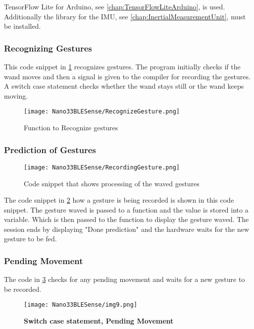 TensorFlow Lite for Arduino, see \ref{chap:TensorFlowLiteArduino}, is used. Additionally the library for the IMU, see \ref{chap:InertialMeasurementUnit}, must be installed.







\subsubsection{Recognizing Gestures}

This code snippet in \ref{fig:img13} recognizes gestures. The program initially checks if the wand moves and then a signal is given to the compiler for recording the gestures. A switch case statement checks whether the wand stays still or the wand keeps moving.

\begin{figure}[h!]
    \texttt{[image: Nano33BLESense/RecognizeGesture.png]}
    \caption{Function to Recognize gestures}
    \label{fig:img13}
\end{figure}

\subsubsection{Prediction of Gestures}

\begin{figure}[h!]
    \texttt{[image: Nano33BLESense/RecordingGesture.png]}
    \caption{Code snippet that shows processing of the waved gestures}
    \label{fig:img14}
\end{figure}

The code snippet in \ref{fig:img14} how a gesture is being recorded is shown in this code snippet. The gesture waved is passed to a function  and the value is stored into a variable. Which is then passed to the function  to display the gesture waved. The session ends by displaying "Done prediction" and the hardware waits for the new gesture to be fed.

\subsubsection{Pending Movement}
The code in \ref{fig:img9} checks for any pending movement and waits for a new gesture to be recorded.
\begin{figure}[h!]
    \texttt{[image: Nano33BLESense/img9.png]}
    \caption{\textbf{Switch case statement, Pending Movement}}
    \label{fig:img9}
\end{figure}

